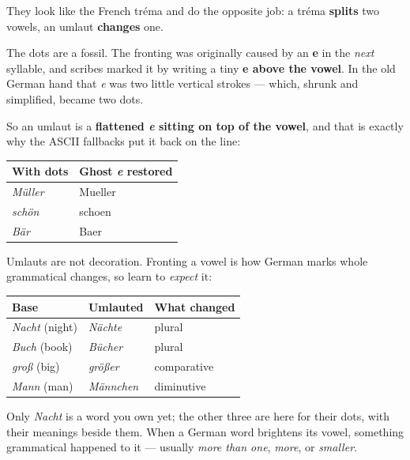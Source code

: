 They look like the French tréma and do the opposite job: a tréma \textbf{splits} two vowels, an umlaut \textbf{changes} one.

\begin{cousinweb}
The dots are a fossil. The fronting was originally caused by an \textbf{e} in the \emph{next} syllable, and scribes marked it by writing a tiny \textbf{e above the vowel}. In the old German hand that \emph{e} was two little vertical strokes — which, shrunk and simplified, became two dots.

So an umlaut is a \textbf{flattened \emph{e} sitting on top of the vowel}, and that is exactly why the ASCII fallbacks put it back on the line:

\noindent
\begin{tabularx}{\linewidth}{@{}>{\raggedright\arraybackslash}X>{\raggedright\arraybackslash}X@{}}
\toprule
\textbf{With dots} & \textbf{Ghost \emph{e} restored} \\
\midrule
\emph{Müller} & Mueller \\
\emph{schön} & schoen \\
\emph{Bär} & Baer \\
\bottomrule
\end{tabularx}
\end{cousinweb}

\begin{grammarlens}[title={Grammar Lens: the umlaut does real work}]
Umlauts are not decoration. Fronting a vowel is how German marks whole grammatical changes, so learn to \emph{expect} it:

\noindent
\begin{tabularx}{\linewidth}{@{}>{\raggedright\arraybackslash}X>{\raggedright\arraybackslash}X>{\raggedright\arraybackslash}X@{}}
\toprule
\textbf{Base} & \textbf{Umlauted} & \textbf{What changed} \\
\midrule
\emph{Nacht} (night) & \emph{Nächte} & plural \\
\emph{Buch} (book) & \emph{Bücher} & plural \\
\emph{groß} (big) & \emph{größer} & comparative \\
\emph{Mann} (man) & \emph{Männchen} & diminutive \\
\bottomrule
\end{tabularx}

Only \emph{Nacht} is a word you own yet; the other three are here for their dots, with their meanings beside them. When a German word brightens its vowel, something grammatical happened to it — usually \emph{more than one}, \emph{more}, or \emph{smaller}.
\end{grammarlens}

